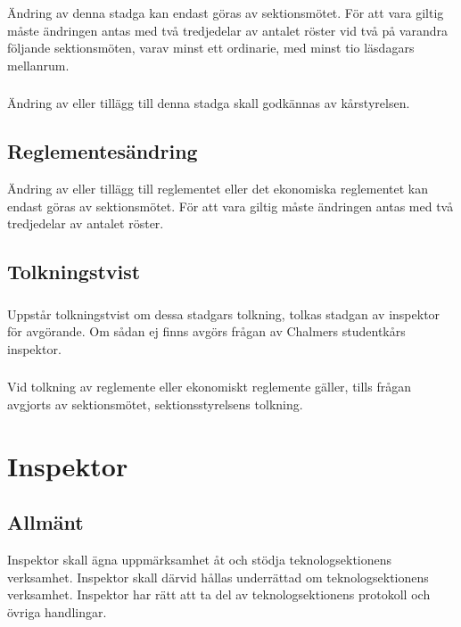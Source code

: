 \documentclass[a4paper, 10pt]{article}
\begin{document}
\subsubsection{}
Ändring av denna stadga kan endast göras av sektionsmötet. För att vara giltig måste ändringen antas med två tredjedelar av antalet röster vid två på varandra följande sektionsmöten, varav minst ett ordinarie, med minst tio läsdagars mellanrum.
\subsubsection{}
Ändring av eller tillägg till denna stadga skall godkännas av kårstyrelsen.
\subsection{Reglementesändring}
Ändring av eller tillägg till reglementet eller det ekonomiska reglementet kan endast göras av sektionsmötet. För att vara giltig måste ändringen antas med två tredjedelar av antalet röster.
\subsection{Tolkningstvist}
\subsubsection{}
Uppstår tolkningstvist om dessa stadgars tolkning, tolkas stadgan av inspektor för avgörande. Om sådan ej finns avgörs frågan av Chalmers studentkårs inspektor.
\subsubsection{}
Vid tolkning av reglemente eller ekonomiskt reglemente gäller, tills frågan avgjorts av sektionsmötet, sektionsstyrelsens tolkning.
\newpage

\section{Inspektor}
\subsection{Allmänt}
Inspektor skall ägna uppmärksamhet åt och stödja teknologsektionens verksamhet. Inspektor skall därvid hållas underrättad om teknologsektionens verksamhet. Inspektor har rätt att ta del av teknologsektionens protokoll och övriga handlingar.
\end{document}
